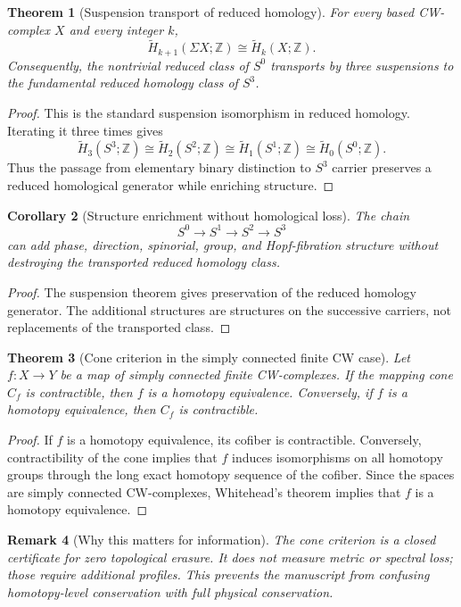 \documentclass[11pt,a4paper]{article}
\newtheorem{theorem}{Theorem}[section]
\newtheorem{corollary}[theorem]{Corollary}
\newtheorem{remark}[theorem]{Remark}
\begin{document}
\begin{theorem}[Suspension transport of reduced homology]
For every based CW-complex $X$ and every integer $k$,
\[
\widetilde H_{k+1}(\Sigma X;\mathbb Z)\cong \widetilde H_k(X;\mathbb Z).
\]
Consequently, the nontrivial reduced class of $S^0$ transports by three suspensions to the fundamental reduced homology class of $S^3$.
\end{theorem}
\begin{proof}
This is the standard suspension isomorphism in reduced homology.  Iterating it three times gives
\[
\widetilde H_3(S^3;\mathbb Z)
\cong \widetilde H_2(S^2;\mathbb Z)
\cong \widetilde H_1(S^1;\mathbb Z)
\cong \widetilde H_0(S^0;\mathbb Z).
\]
Thus the passage from elementary binary distinction to $S^3$ carrier preserves a reduced homological generator while enriching structure.\end{proof}

\begin{corollary}[Structure enrichment without homological loss]
The chain
\[
S^0\longrightarrow S^1\longrightarrow S^2\longrightarrow S^3
\]
can add phase, direction, spinorial, group, and Hopf-fibration structure without destroying the transported reduced homology class.
\end{corollary}
\begin{proof}
The suspension theorem gives preservation of the reduced homology generator.  The additional structures are structures on the successive carriers, not replacements of the transported class.\end{proof}

\begin{theorem}[Cone criterion in the simply connected finite CW case]
Let $f:X\to Y$ be a map of simply connected finite CW-complexes.  If the mapping cone $C_f$ is contractible, then $f$ is a homotopy equivalence.  Conversely, if $f$ is a homotopy equivalence, then $C_f$ is contractible.
\end{theorem}
\begin{proof}
If $f$ is a homotopy equivalence, its cofiber is contractible.  Conversely, contractibility of the cone implies that $f$ induces isomorphisms on all homotopy groups through the long exact homotopy sequence of the cofiber.  Since the spaces are simply connected CW-complexes, Whitehead's theorem implies that $f$ is a homotopy equivalence.\end{proof}

\begin{remark}[Why this matters for information]
The cone criterion is a closed certificate for zero topological erasure.  It does not measure metric or spectral loss; those require additional profiles.  This prevents the manuscript from confusing homotopy-level conservation with full physical conservation.
\end{remark}
\end{document}
